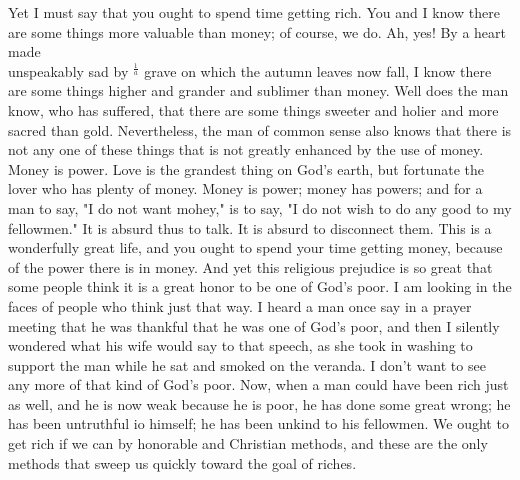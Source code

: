 \documentclass[10pt]{article}
\begin{document}
Yet I must say that you ought to spend time getting rich. You and I know there are some things more valuable than money; of course, we do. Ah, yes! By a heart made\\
unspeakably sad by ${ }^{\frac{1}{a}}$ grave on which the autumn leaves now fall, I know there are some things higher and grander and sublimer than money. Well does the man know, who has suffered, that there are some things sweeter and holier and more sacred than gold. Nevertheless, the man of common sense also knows that there is not any one of these things that is not greatly enhanced by the use of money. Money is power. Love is the grandest thing on God's earth, but fortunate the lover who has plenty of money. Money is power; money has powers; and for a man to say, "I do not want mohey," is to say, "I do not wish to do any good to my fellowmen." It is absurd thus to talk. It is absurd to disconnect them. This is a wonderfully great life, and you ought to spend your time getting money, because of the power there is in money. And yet this religious prejudice is so great that some people think it is a great honor to be one of God's poor. I am looking in the faces of people who think just that way. I heard a man once say in a prayer meeting that he was thankful that he was one of God's poor, and then I silently wondered what his wife would say to that speech, as she took in washing to support the man while he sat and smoked on the veranda. I don't want to see any more of that kind of God's poor. Now, when a man could have been rich just as well, and he is now weak because he is poor, he has done some great wrong; he has been untruthful io himself; he has been unkind to his fellowmen. We ought to get rich if we can by honorable and Christian methods, and these are the only methods that sweep us quickly toward the goal of riches.
\end{document}
